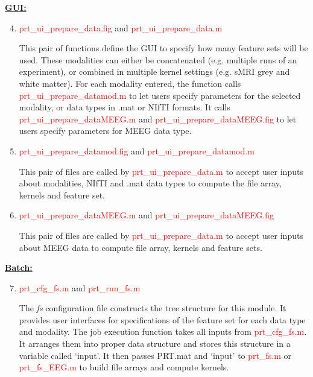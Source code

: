 \noindent \textbf{\underline{GUI:}}

\begin{enumerate}
\setcounter{enumi}{3}

\item \textcolor{red}{prt\_ui\_prepare\_data.fig} and \textcolor{red}{prt\_ui\_prepare\_data.m}

This pair of functions define the GUI to specify how many feature sets will be used. These modalities can either be concatenated (e.g. multiple runs of an experiment), or combined in multiple kernel settings (e.g. sMRI grey and white matter). For each modality entered, the function calls \textcolor{red}{prt\_ui\_prepare\_datamod.m} to let users specify parameters for the selected modality, or data types in .mat or NIfTI formats. It calls \textcolor{red}{prt\_ui\_prepare\_dataMEEG.m} and \textcolor{red}{prt\_ui\_prepare\_dataMEEG.fig} to let users specify parameters for MEEG data type.

\item \textcolor{red}{prt\_ui\_prepare\_datamod.fig} and \textcolor{red}{prt\_ui\_prepare\_datamod.m}
 
This pair of files are called by \textcolor{red}{prt\_ui\_prepare\_data.m} to accept user inputs about modalities, NIfTI and .mat data types to compute the file array, kernels and feature set. 

\item \textcolor{red}{prt\_ui\_prepare\_dataMEEG.m} and \textcolor{red}{prt\_ui\_prepare\_dataMEEG.fig}

This pair of files are called by \textcolor{red}{prt\_ui\_prepare\_data.m} to accept user inputs about MEEG data to compute file array, kernels and feature sets. 


\end{enumerate}

\noindent \textbf{\underline{Batch:}}

\begin{enumerate}
\setcounter{enumi}{6}

\item \textcolor{red}{prt\_cfg\_fs.m} and \textcolor{red}{prt\_run\_fs.m}

The \textit{fs} configuration file constructs the tree structure for this module. It provides user interfaces for specifications of the feature set for each data type and modality. The job execution function takes all inputs from \textcolor{red}{prt\_cfg\_fs.m}. It arranges them into proper data structure and stores this structure in a variable called `input'. It then passes PRT.mat and `input' to \textcolor{red}{prt\_fs.m} or \textcolor{red}{prt\_fs\_EEG.m} to build file arrays and compute kernels.


\end{enumerate}




